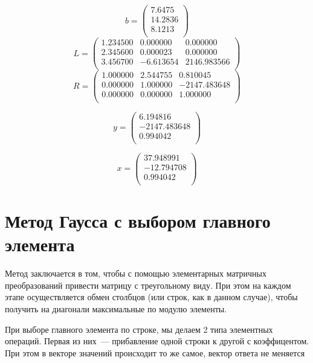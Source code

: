 \documentclass[11pt,a4paper,oneside]{article}
\begin{document}
$$ b = \left(\begin{matrix}
	7.6475 \\
	14.2836 \\
	8.1213 \\
\end{matrix}\right) $$
$$ L = \left(\begin{matrix}
	1.234500 & 0.000000 & 0.000000 \\
	2.345600 & 0.000023 & 0.000000 \\
	3.456700 & -6.613654 & 2146.983566 \\
\end{matrix}\right) $$
$$ R = \left(\begin{matrix}
	1.000000 & 2.544755 & 0.810045 \\
	0.000000 & 1.000000 & -2147.483648 \\
	0.000000 & 0.000000 & 1.000000 \\
\end{matrix}\right) $$

$$ y = \left(\begin{matrix}
	6.194816 \\
	-2147.483648 \\
	0.994042 \\
\end{matrix}\right) $$

$$ x = \left(\begin{matrix}
	37.948991 \\
	-12.794708 \\
	0.994042 \\
\end{matrix}\right) $$

\section{Метод Гаусса с выбором главного элемента}

Метод заключается в том, чтобы с помощью элементарных матричных преобразований привести матрицу с треугольному виду. При этом на каждом этапе осуществляется обмен столбцов (или строк, как в данном случае), чтобы получить на диагонали максимальные по модулю элементы.

При выборе главного элемента по строке, мы делаем 2 типа элементных операций. Первая из них~--- прибавление одной строки к другой с коэффицентом. При этом в векторе значений происходит то же самое, вектор ответа не меняется
\end{document}
